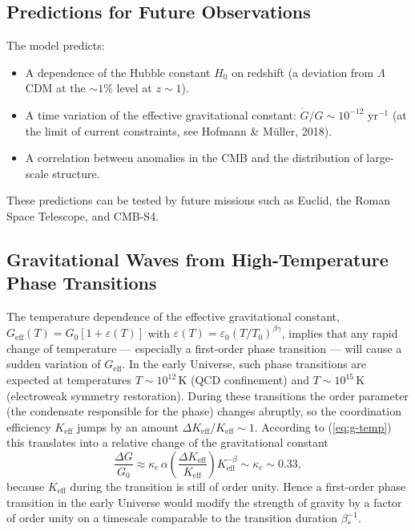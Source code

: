 \documentclass[12pt]{article}
\theoremstyle{remark}
\newcommand{\Keff}{K_{\mathrm{eff}}}
\newcommand{\eps}{\varepsilon}
\begin{document}
	\subsection{Predictions for Future Observations}
	\label{subsec:cosmo-predictions}
	
	The model predicts:
	\begin{itemize}
		\item A dependence of the Hubble constant $H_0$ on redshift (a deviation from $\Lambda$CDM at the $\sim 1\%$ level at $z\sim 1$).
		\item A time variation of the effective gravitational constant: $\dot{G}/G \sim 10^{-12}$ yr$^{-1}$ (at the limit of current constraints, see Hofmann \& Müller, 2018).
		\item A correlation between anomalies in the CMB and the distribution of large-scale structure.
	\end{itemize}
	These predictions can be tested by future missions such as Euclid, the Roman Space Telescope, and CMB-S4.
	
	\subsection{Gravitational Waves from High-Temperature Phase Transitions}
	\label{subsec:gw}
	
	The temperature dependence of the effective gravitational constant, 
	$G_{\mathrm{eff}}(T)=G_0[1+\eps(T)]$ with $\eps(T)=\eps_0(T/T_0)^{\beta\gamma}$,
	implies that any rapid change of temperature --- especially a first-order phase 
	transition --- will cause a sudden variation of $G_{\mathrm{eff}}$. 
	In the early Universe, such phase transitions are expected at temperatures 
	$T\sim 10^{12}\,\mathrm{K}$ (QCD confinement) and $T\sim 10^{15}\,\mathrm{K}$ 
	(electroweak symmetry restoration). During these transitions the order parameter 
	(the condensate responsible for the phase) changes abruptly, so the coordination 
	efficiency $\Keff$ jumps by an amount $\Delta\Keff/\Keff\sim 1$. 
	According to (\ref{eq:g-temp}) this translates into a relative change of the 
	gravitational constant
	\begin{equation}
		\frac{\Delta G}{G_0} \approx \kappa_c\,\alpha \left(\frac{\Delta\Keff}{\Keff}\right) 
		\Keff^{-\beta} \sim \kappa_c \sim 0.33,
		\label{eq:deltaG-phase}
	\end{equation}
	because $\Keff$ during the transition is still of order unity. 
	Hence a first-order phase transition in the early Universe would modify the 
	strength of gravity by a factor of order unity on a timescale comparable to the 
	transition duration $\beta_*^{-1}$.
	
\end{document}

